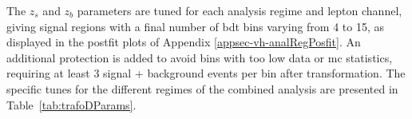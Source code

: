 The $z_s$ and $z_b$ parameters are tuned for each analysis regime and lepton channel, giving signal regions with a final number of \gls{bdt} bins varying from 4 to 15, as displayed in the postfit plots of Appendix \ref{appsec-vh-analRegPosfit}. An additional protection is added to avoid bins with too low data or \gls{mc} statistics, requiring at least 3 signal + background events per bin after transformation. The specific tunes for the different regimes of the combined analysis are presented in Table~\ref{tab:trafoDParams}.
\newpage